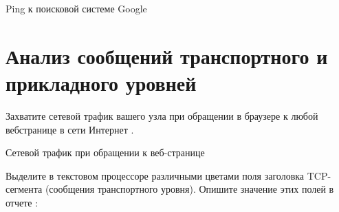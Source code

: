 \begin{image}
	\caption{Ping к поисковой системе Google}
	\label{fig:wrsh:google:ping:r5}
\end{image}

\section{Анализ сообщений транспортного и прикладного уровней}

Захватите сетевой трафик вашего узла при обращении в браузере к любой вебстранице в сети Интернет .

\begin{image}
	\caption{Сетевой трафик при обращении к веб-странице}
	\label{fig:wrsh:web}
\end{image}

Выделите в текстовом процессоре различными цветами
поля заголовка TCP-сегмента (сообщения транспортного уровня).
Опишите значение этих полей в отчете :

